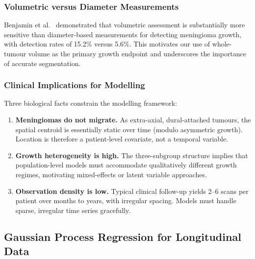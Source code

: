 \subsubsection{Volumetric versus Diameter Measurements}

Benjamin et al.\ \cite{benjamin2021volumetric} demonstrated that volumetric
assessment is substantially more sensitive than diameter-based measurements for
detecting meningioma growth, with detection rates of 15.2\% versus 5.6\%. This
motivates our use of whole-tumour volume as the primary growth endpoint and
underscores the importance of accurate segmentation.

\subsubsection{Clinical Implications for Modelling}

Three biological facts constrain the modelling framework:
\begin{enumerate}[leftmargin=*]
  \item \textbf{Meningiomas do not migrate.} As extra-axial, dural-attached
    tumours, the spatial centroid is essentially static over time (modulo
    asymmetric growth). Location is therefore a patient-level covariate, not
    a temporal variable.
  \item \textbf{Growth heterogeneity is high.} The three-subgroup structure
    \cite{engelhardt2023gompertz} implies that population-level models must
    accommodate qualitatively different growth regimes, motivating
    mixed-effects or latent variable approaches.
  \item \textbf{Observation density is low.} Typical clinical follow-up
    yields 2--6 scans per patient over months to years, with irregular
    spacing. Models must handle sparse, irregular time series gracefully.
\end{enumerate}

\subsection{Gaussian Process Regression for Longitudinal Data}
\label{sec:bg:gp}

